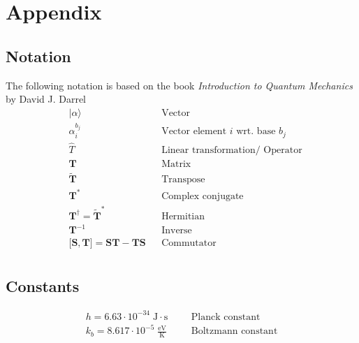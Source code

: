 \section{Appendix}
\subsection{Notation}
The following notation is based on the book \textit{Introduction to Quantum Mechanics} by David J. Darrel
\begin{align*}
     & \lvert \alpha \rangle                                             &  & \text{Vector}                             \\
     & \alpha_i^{b_j}                                                    &  & \text{Vector element $i$ wrt.\ base } b_j \\
     & \hat{T}                                                           &  & \text{Linear transformation/ Operator}              \\
     & \mathbf{T}                                                        &  & \text{Matrix}                             \\
     & \widetilde{\mathbf{T}}                                            &  & \text{Transpose}                          \\
     & \mathbf{T}^*                                                      &  & \text{Complex conjugate}                  \\
     & \mathbf{T}^\dagger = {\widetilde{\mathbf{T}}}^*                   &  & \text{Hermitian}                          \\
     & \mathbf{T}^{-1}                                                   &  & \text{Inverse}                            \\
     & \lbrack \mathbf{S},\mathbf{T} \rbrack = \mathbf{ST} - \mathbf{TS} &  & \text{Commutator}                         \\
\end{align*}

\subsection{Constants}
\noindent\begin{align*}
    h = 6.63 \cdot 10^{-34} \;\mathrm{J\cdot s}      &  &  & \text{Planck constant}    \\
    k_b =8.617 \cdot 10^{-5} \;\mathrm{\frac{eV}{K}} &  &  & \text{Boltzmann constant}
\end{align*}

